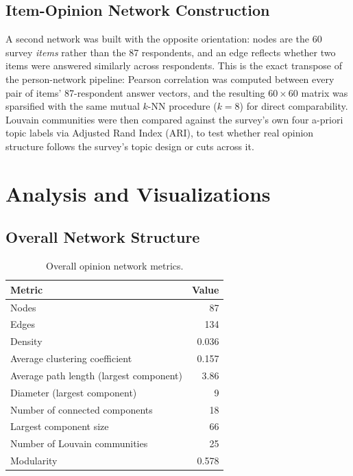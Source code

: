 \documentclass[11pt]{article}
\begin{document}
\subsection{Item-Opinion Network Construction}
\label{sec:item_network}
A second network was built with the opposite orientation: nodes are the 60 survey
\emph{items} rather than the 87 respondents, and an edge reflects whether two items
were answered similarly across respondents. This is the exact transpose of the
person-network pipeline: Pearson correlation was computed between every pair of items'
87-respondent answer vectors, and the resulting $60\times 60$ matrix was sparsified with
the same mutual $k$-NN procedure ($k=8$) for direct comparability. Louvain communities
were then compared against the survey's own four a-priori topic labels via Adjusted
Rand Index (ARI), to test whether real opinion structure follows the survey's topic
design or cuts across it.

\section{Analysis and Visualizations}
\label{sec:analysis}

\subsection{Overall Network Structure}

\begin{table}[htbp]
\centering
\begin{tabular}{lr}
\toprule
Metric & Value \\
\midrule
Nodes & 87 \\
Edges & 134 \\
Density & 0.036 \\
Average clustering coefficient & 0.157 \\
Average path length (largest component) & 3.86 \\
Diameter (largest component) & 9 \\
Number of connected components & 18 \\
Largest component size & 66 \\
Number of Louvain communities & 25 \\
Modularity & 0.578 \\
\bottomrule
\end{tabular}
\caption{Overall opinion network metrics.}
\label{tab:overall_metrics}
\end{table}
\end{document}
